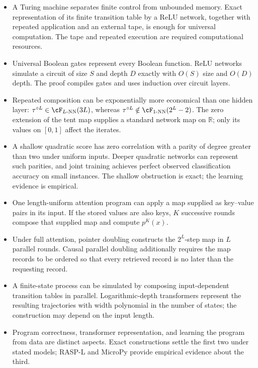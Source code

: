 \documentclass[11pt,twoside]{article}
\newcommand{\R}{\mathbb R}
\theoremstyle{definition}
\theoremstyle{remark}
\begin{document}
\begin{itemize}[leftmargin=*]
\item A Turing machine separates finite control from unbounded memory. Exact
representation of its finite transition table by a ReLU network, together
with repeated application and an external tape, is enough for universal
computation. The tape and repeated execution are required computational
resources.
\item Universal Boolean gates represent every Boolean function. ReLU networks
simulate a circuit of size $S$ and depth $D$ exactly with $O(S)$ size and
$O(D)$ depth. The proof compiles gates and uses induction over circuit layers.
\item Repeated composition can be exponentially more economical than one
hidden layer: $\tau^{\circ L}\in\cF_{L\text{-NN}}(3L)$, whereas
$\tau^{\circ L}\notin\cF_{1\text{-NN}}(2^L-2)$. The zero extension of the
tent map supplies a standard network map on $\R$; only its values on $[0,1]$
affect the iterates.
\item A shallow quadratic score has zero correlation with a parity of degree
greater than two under uniform inputs. Deeper quadratic networks can
represent such parities, and joint training achieves perfect observed
classification accuracy on small instances. The shallow obstruction is
exact; the learning evidence is empirical.
\item One length-uniform attention program can apply a map supplied as
key--value pairs in its input. If the stored values are also keys, $K$
successive rounds compose that supplied map and compute $p^K(x)$.
\item Under full attention, pointer doubling constructs the $2^L$-step map in
$L$ parallel rounds. Causal parallel doubling additionally requires the map
records to be ordered so that every retrieved record is no later than the
requesting record.
\item A finite-state process can be simulated by composing input-dependent
transition tables in parallel. Logarithmic-depth transformers represent
the resulting trajectories with width polynomial in the number of states;
the construction may depend on the input length.
\item Program correctness, transformer representation, and learning the
program from data are distinct aspects. Exact constructions settle the first
two under stated models; RASP-L and MicroPy provide empirical evidence about
the third.
\end{itemize}
\end{document}
